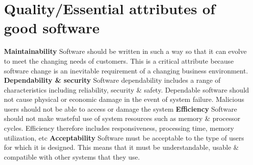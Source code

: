 \documentclass{report}
\begin{document}
\section{Quality/Essential attributes of good software}
\noindent \textbf{Maintainability}\newline
Software should be written in such a way so that it can evolve to meet the changing needs of customers. This is a critical attribute because software change is an inevitable requirement of a changing business environment.\newline
\textbf{Dependability \& security}\newline
Software dependability includes a range of characteristics including reliability, security \& safety. Dependable software should not cause physical or economic damage in the event of
system failure. Malicious users should not be able to access or damage the system\newline
\textbf{Efficiency}\newline
Software should not make wasteful use of system resources such as memory \& processor cycles. Efficiency therefore includes responsiveness, processing time, memory utilization, etc\newline
\textbf{Acceptability}\newline
Software must be acceptable to the type of users for which it is designed. This means that it must be understandable, usable \& compatible with other systems that they use.

\newpage
\end{document}
